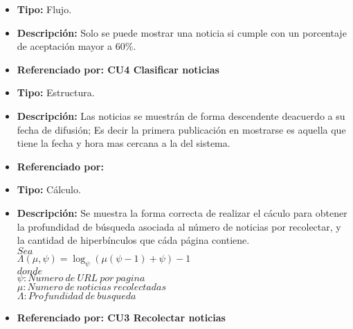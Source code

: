 \begin{itemize}
  \item \textbf{Tipo:}  Flujo.
  \item \textbf{Descripción:} Solo se puede mostrar una noticia si cumple con un porcentaje de aceptación mayor a 60\%.
  \item \textbf{Referenciado por: CU4 Clasificar noticias}  \\
\end{itemize}




\begin{itemize}
  \item \textbf{Tipo:} Estructura.
  \item \textbf{Descripción:} Las noticias se muestrán de forma descendente deacuerdo a su fecha de difusión; Es decir la primera publicación en mostrarse es aquella que tiene la fecha y hora mas cercana a la del sistema.
  \item \textbf{Referenciado por:}  \\
\end{itemize}


\begin{itemize}
  \item \textbf{Tipo:} Cálculo.
  \item \textbf{Descripción:} Se muestra la forma correcta de realizar el cáculo para obtener la profundidad de búsqueda asociada al número de noticias por recolectar, y la cantidad de hiperbínculos que cáda página contiene.\\
 
  $Sea$\\

  $\Lambda(\mu,\psi)=\log_{\psi}{(\mu(\psi-1)+\psi)}-1$\\

  $donde$\\
  $\psi:Numero\ de\ URL\ por\ pagina$\\
  $\mu:Numero\ de\ noticias\ recolectadas$\\
  $\Lambda:Profundidad\ de\ busqueda$\\



  \item \textbf{Referenciado por: CU3 Recolectar noticias} \\
\end{itemize}

